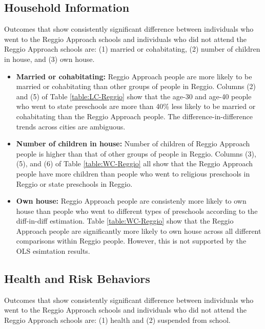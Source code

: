 \documentclass[11pt]{article}
\begin{document}
\subsection{Household Information}
Outcomes that show consistently significant difference between individuals who went to the Reggio Approach schools and individuals who did not attend the Reggio Approach schools are: (1) married or cohabitating, (2) number of children in house, and (3) own house.

\begin{itemize}
\item \textbf{Married or cohabitating:} Reggio Approach people are more likely to be married or cohabitating than other groups of people in Reggio. Columns (2) and (5) of Table \ref{table:LC-Reggio} show that the age-30 and age-40 people who went to state preschools are more than 40\% less likely to be married or cohabitating than the Reggio Approach people. The difference-in-difference trends across cities are ambiguous.
\item \textbf{Number of children in house:} Number of children of Reggio Approach people is higher than that of other groups of people in Reggio. Columns (3), (5), and (6) of Table \ref{table:WC-Reggio} all show that the Reggio Approach people have more children than people who went to religious preschools in Reggio or state preschools in Reggio.
\item \textbf{Own house:} Reggio Approach people are consistenly more likely to own house than people who went to different types of preschools according to the diff-in-diff estimation. Table \ref{table:WC-Reggio} show that the Reggio Approach people are significantly more likely to own house across all different comparisons within Reggio people. However, this is not supported by the OLS esimtation results.
\end{itemize}


\subsection{Health and Risk Behaviors}
Outcomes that show consistently significant difference between individuals who went to the Reggio Approach schools and individuals who did not attend the Reggio Approach schools are: (1) health and (2) suspended from school.
\end{document}
